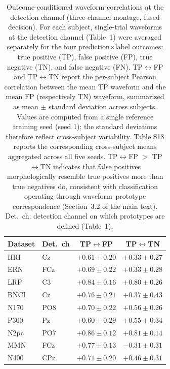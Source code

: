 \begin{table}[t]
\centering
\setlength{\tabcolsep}{6pt}
\caption{%
Outcome-conditioned waveform correlations at the detection channel (three-channel montage, fused decision). For each subject, single-trial waveforms at the detection channel (Table~1) were averaged separately for the four prediction$\times$label outcomes: true positive (TP), false positive (FP), true negative (TN), and false negative (FN). TP$\leftrightarrow$FP and TP$\leftrightarrow$TN report the per-subject Pearson correlation between the mean TP waveform and the mean FP (respectively TN) waveform, summarized as mean $\pm$ standard deviation across subjects. Values are computed from a single reference training seed (seed 1); the standard deviations therefore reflect cross-subject variability. Table S18 reports the corresponding cross-subject means aggregated across all five seeds. TP$\leftrightarrow$FP $>$ TP$\leftrightarrow$TN indicates that false positives morphologically resemble true positives more than true negatives do, consistent with classification operating through waveform--prototype correspondence (Section~3.2 of the main text). Det.\ ch: detection channel on which prototypes are defined (Table~1).%
}
\label{sup:tab-corr}
\begin{tabular}{llcc}
\toprule
Dataset & Det.\ ch & TP$\leftrightarrow$FP & TP$\leftrightarrow$TN \\
\midrule
HRI & Cz & $+0.61 \pm 0.20$ & $+0.33 \pm 0.27$ \\
ERN & FCz & $+0.69 \pm 0.22$ & $+0.33 \pm 0.28$ \\
LRP & C3 & $+0.84 \pm 0.16$ & $+0.80 \pm 0.26$ \\
BNCI & Cz & $+0.76 \pm 0.21$ & $+0.37 \pm 0.43$ \\
N170 & PO8 & $+0.70 \pm 0.22$ & $+0.56 \pm 0.26$ \\
P300 & Pz & $+0.60 \pm 0.29$ & $+0.55 \pm 0.34$ \\
N2pc & PO7 & $+0.86 \pm 0.12$ & $+0.81 \pm 0.14$ \\
MMN & FCz & $+0.77 \pm 0.13$ & $-0.31 \pm 0.31$ \\
N400 & CPz & $+0.71 \pm 0.20$ & $+0.46 \pm 0.31$ \\
\bottomrule
\end{tabular}
\end{table}
